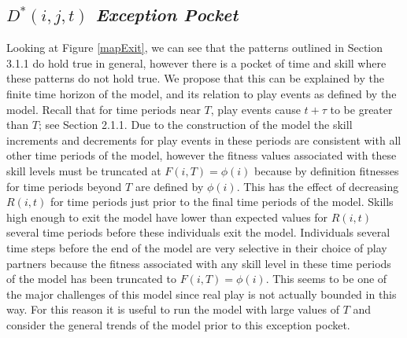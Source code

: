 \documentclass[12pt, letterpaper, fleqn]{article}
\begin{document}
  \subsection*{\it $D^*(i,j,t)$ Exception Pocket}
      Looking at Figure \ref{mapExit}, we can see that the patterns outlined in Section 3.1.1 do hold true in general, however there is a pocket of time and skill where these patterns do not hold true.
      We propose that this can be explained by the finite time horizon of the model, and its relation to play events as defined by the model. 
      Recall that for time periods near $T$, play events cause $t+\tau$ to be greater than $T$; see Section 2.1.1.   
      Due to the construction of the model the skill increments and decrements for play events in these periods are consistent with all other time periods of the model, however the fitness values associated with these skill levels must be truncated at $F(i,T)=\phi(i)$ because by definition fitnesses for time periods beyond $T$ are defined by $\phi(i)$. %
      This has the effect of decreasing $R(i,t)$ for time periods just prior to the final time periods of the model.
      Skills high enough to exit the model have lower than expected values for $R(i,t)$ several time periods before these individuals exit the model.  %
      Individuals several time steps before the end of the model are very selective in their choice of play partners because the fitness associated with any skill level in these time periods of the model has been truncated to $F(i,T)=\phi(i)$. %
      This seems to be one of the major challenges of this model since real play is not actually bounded in this way. 
      For this reason it is useful to run the model with large values of $T$ and consider the general trends of the model prior to this exception pocket. 
      
\end{document}

